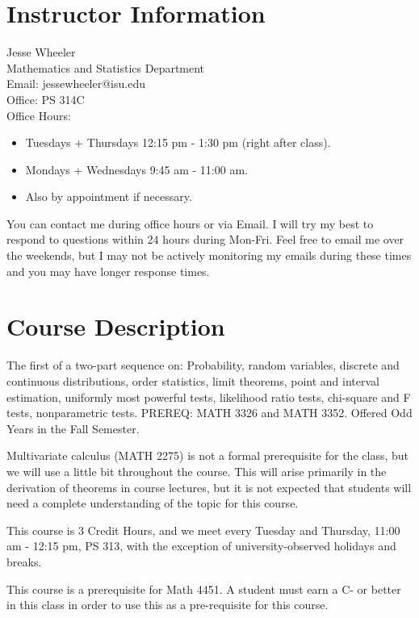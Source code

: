\documentclass[11pt]{article}\usepackage[]{graphicx}\usepackage[]{xcolor}
\begin{document}
\section{Instructor Information}

Jesse Wheeler \\
Mathematics and Statistics Department \\
Email: jessewheeler@isu.edu\\
Office: PS 314C\\
Office Hours: 
\begin{itemize}
  \item Tuesdays + Thursdays 12:15 pm - 1:30 pm (right after class).
  \item Mondays + Wednesdays 9:45 am - 11:00 am.
  \item Also by appointment if necessary.
\end{itemize}

You can contact me during office hours or via Email. 
I will try my best to respond to questions within 24 hours during Mon-Fri.
Feel free to email me over the weekends, but I may not be actively monitoring my emails during these times and you may have longer response times.

\section{Course Description}

The first of a two-part sequence on:
Probability, random variables, discrete and continuous distributions, order statistics, limit theorems, point and interval estimation, uniformly most powerful tests, likelihood ratio tests, chi-square and F tests, nonparametric tests. 
PREREQ: MATH 3326 and MATH 3352. Offered Odd Years in the Fall Semester.

Multivariate calculus (MATH 2275) is not a formal prerequisite for the class, but we will use a little bit throughout the course. This will arise primarily in the derivation of theorems in course lectures, but it is not expected that students will need a complete understanding of the topic for this course.

This course is 3 Credit Hours, and we meet every Tuesday and Thursday, 11:00 am - 12:15 pm, PS 313, with the exception of university-observed holidays and breaks.

This course is a prerequisite for Math 4451. A student must earn a C- or better in this class in order to use this as a pre-requisite for this course.
\end{document}
